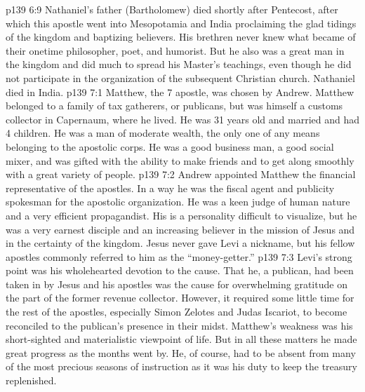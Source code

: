 \vs p139 6:9 \pc Nathaniel’s father (Bartholomew) died shortly after Pentecost, after which this apostle went into Mesopotamia and India proclaiming the glad tidings of the kingdom and baptizing believers. His brethren never knew what became of their onetime philosopher, poet, and humorist. But he also was a great man in the kingdom and did much to spread his Master’s teachings, even though he did not participate in the organization of the subsequent Christian church. Nathaniel died in India.
\vs p139 7:1 Matthew, the 7 apostle, was chosen by Andrew. Matthew belonged to a family of tax gatherers, or publicans, but was himself a customs collector in Capernaum, where he lived. He was 31 years old and married and had 4 children. He was a man of moderate wealth, the only one of any means belonging to the apostolic corps. He was a good business man, a good social mixer, and was gifted with the ability to make friends and to get along smoothly with a great variety of people.
\vs p139 7:2 \pc Andrew appointed Matthew the financial representative of the apostles. In a way he was the fiscal agent and publicity spokesman for the apostolic organization. He was a keen judge of human nature and a very efficient propagandist. His is a personality difficult to visualize, but he was a very earnest disciple and an increasing believer in the mission of Jesus and in the certainty of the kingdom. Jesus never gave Levi a nickname, but his fellow apostles commonly referred to him as the “money\hyp{}getter.”
\vs p139 7:3 Levi’s strong point was his wholehearted devotion to the cause. That he, a publican, had been taken in by Jesus and his apostles was the cause for overwhelming gratitude on the part of the former revenue collector. However, it required some little time for the rest of the apostles, especially Simon Zelotes and Judas Iscariot, to become reconciled to the publican’s presence in their midst. Matthew’s weakness was his short\hyp{}sighted and materialistic viewpoint of life. But in all these matters he made great progress as the months went by. He, of course, had to be absent from many of the most precious seasons of instruction as it was his duty to keep the treasury replenished.

